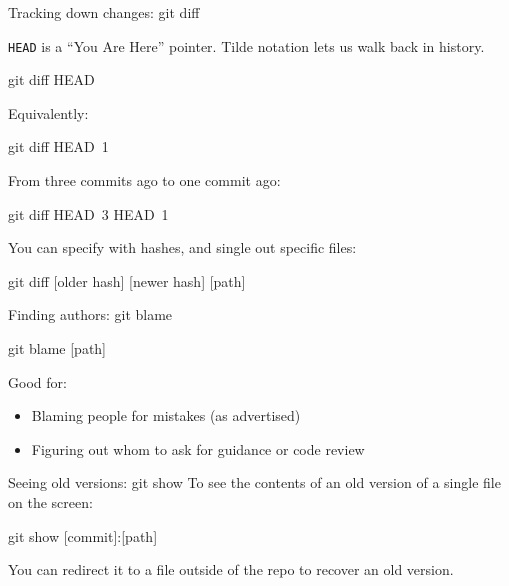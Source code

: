 \begin{frame}[fragile]{Tracking down changes: git diff}

  \texttt{HEAD} is a ``You Are Here'' pointer. Tilde notation lets us
  walk back in history.

  \begin{gitCommand}git diff HEAD~\end{gitCommand}

  Equivalently:

  \begin{gitCommand}git diff HEAD~1\end{gitCommand}

  From three commits ago to one commit ago:

  \begin{gitCommand}git diff HEAD~3 HEAD~1\end{gitCommand}

  You can specify with hashes, and single out specific files:

  \begin{gitCommand}git diff [older hash] [newer hash] [path]\end{gitCommand}

\end{frame}

\begin{frame}[fragile]{Finding authors: git blame}

  \begin{gitCommand}git blame [path]\end{gitCommand}

  Good for:

  \begin{itemize}
    \item Blaming people for mistakes (as advertised)
    \item Figuring out whom to ask for guidance or code review
  \end{itemize}

\end{frame}

\begin{frame}[fragile]{Seeing old versions: git show}
  To see the contents of an old version of a single file on the screen:

  \begin{gitCommand}git show [commit]:[path]\end{gitCommand}

  You can redirect it to a file outside of the repo to recover an old version.
\end{frame}

